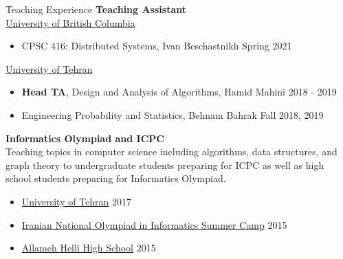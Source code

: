 \documentclass{resume} %
\begin{document}
\begin{rSection}{Teaching Experience}
	{\bf Teaching Assistant}
	\\\href{https://www.ubc.ca/}{University of British Columbia}
	\vspace{-0.5em}
	\begin{itemize}[leftmargin=3mm]
		\setlength{\itemsep}{1pt}
		\setlength{\parskip}{0pt}
		\setlength{\parsep}{0pt}
		\renewcommand\labelitemi{$\cdot$}

		\item CPSC 416: Distributed Systems, Ivan Beschastnikh \hfill Spring 2021
	\end{itemize}
	
	\href{http://ut.ac.ir/en}{University of Tehran}
	\vspace{-0.5em}
	\begin{itemize}[leftmargin=3mm]
		\setlength{\itemsep}{1pt}
		\setlength{\parskip}{0pt}
		\setlength{\parsep}{0pt}
		\renewcommand\labelitemi{$\cdot$}

		\item {\bf Head TA}, Design and Analysis of Algorithms, Hamid Mahini \hfill 2018 - 2019 
		\item Engineering Probability and Statistics, Behnam Bahrak \hfill Fall 2018, 2019
	\end{itemize}
	
	{\bf Informatics Olympiad and ICPC}
	\\Teaching topics in computer science including algorithms, data structures,
	and graph theory to undergraduate students preparing for ICPC as well as high school
	students preparing for Informatics Olympiad.

	\vspace{-0.5em}
	\begin{itemize}[leftmargin=3mm]
		\setlength{\itemsep}{1pt}
		\setlength{\parskip}{0pt}
		\setlength{\parsep}{0pt}
		\renewcommand\labelitemi{$\cdot$}

		\item \href{http://ut.ac.ir/en}{University of Tehran} \hfill 2017
		\item \href{http://inoi.ir/}{Iranian National Olympiad in Informatics Summer Camp} \hfill 2015
		\item \href{http://www.helli.ir/}{Allameh Helli High School} \hfill 2015
	\end{itemize}
\end{rSection}
\end{document}
